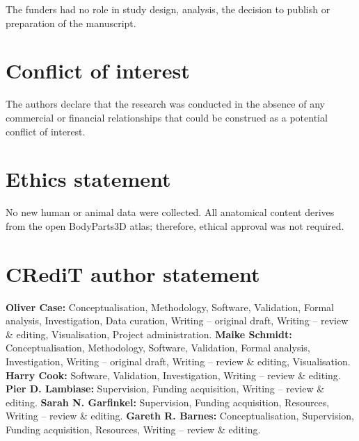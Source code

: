 \documentclass[11pt]{article}
\begin{document}
The funders had no role in study design, analysis, the decision to
publish or preparation of the manuscript.

\section{Conflict of interest}\label{conflict-of-interest}

The authors declare that the research was conducted in the absence of
any commercial or financial relationships that could be construed as a
potential conflict of interest.

\section{Ethics statement}\label{ethics-statement}

No new human or animal data were collected. All anatomical content
derives from the open BodyParts3D atlas; therefore, ethical approval was
not required.

\section{CRediT author statement}\label{credit-author-statement}

\textbf{Oliver Case:} Conceptualisation, Methodology, Software,
Validation, Formal analysis, Investigation, Data curation, Writing --
original draft, Writing -- review \& editing, Visualisation, Project
administration. \textbf{Maike Schmidt:} Conceptualisation, Methodology,
Software, Validation, Formal analysis, Investigation, Writing -- original
draft, Writing -- review \& editing, Visualisation. \textbf{Harry Cook:}
Software, Validation, Investigation, Writing -- review \&
editing. \textbf{Pier D. Lambiase:} Supervision, Funding acquisition,
Writing -- review \& editing. \textbf{Sarah N. Garfinkel:} Supervision,
Funding acquisition, Resources, Writing -- review \& editing.
\textbf{Gareth R. Barnes:} Conceptualisation, Supervision, Funding
acquisition, Resources, Writing -- review \& editing.



\end{document}
